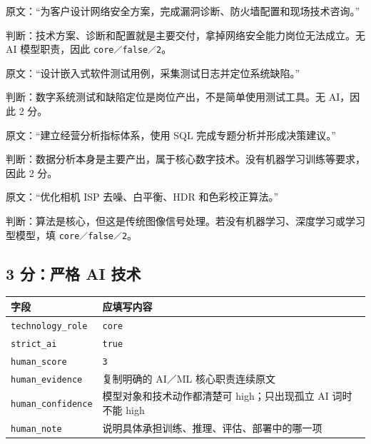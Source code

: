 \documentclass[11pt,a4paper,fontset=none]{ctexart}
\newcommand{\field}[1]{\nolinkurl{#1}}
\begin{document}
\begin{examplebox}[2 分例 1：网络安全技术售前]
原文：“为客户设计网络安全方案，完成漏洞诊断、防火墙配置和现场技术咨询。”

判断：技术方案、诊断和配置就是主要交付，拿掉网络安全能力岗位无法成立。无 AI 模型职责，因此 \texttt{core／false／2}。
\end{examplebox}

\begin{examplebox}[2 分例 2：硬件测试]
原文：“设计嵌入式软件测试用例，采集测试日志并定位系统缺陷。”

判断：数字系统测试和缺陷定位是岗位产出，不是简单使用测试工具。无 AI，因此 2 分。
\end{examplebox}

\begin{examplebox}[2 分例 3：核心数据分析]
原文：“建立经营分析指标体系，使用 SQL 完成专题分析并形成决策建议。”

判断：数据分析本身是主要产出，属于核心数字技术。没有机器学习训练等要求，因此 2 分。
\end{examplebox}

\begin{examplebox}[2 分例 4：传统 ISP 算法]
原文：“优化相机 ISP 去噪、白平衡、HDR 和色彩校正算法。”

判断：算法是核心，但这是传统图像信号处理。若没有机器学习、深度学习或学习型模型，填 \texttt{core／false／2}。
\end{examplebox}

\subsection{3 分：严格 AI 技术}

\noindent\begin{tabularx}{\textwidth}{L{3.1cm}Y}
\toprule
字段 & 应填写内容\\
\midrule
\field{technology_role} & \texttt{core}\\
\field{strict_ai} & \texttt{true}\\
\field{human_score} & \texttt{3}\\
\field{human_evidence} & 复制明确的 AI／ML 核心职责连续原文\\
\field{human_confidence} & 模型对象和技术动作都清楚可 high；只出现孤立 AI 词时不能 high\\
\field{human_note} & 说明具体承担训练、推理、评估、部署中的哪一项\\
\bottomrule
\end{tabularx}
\end{document}
